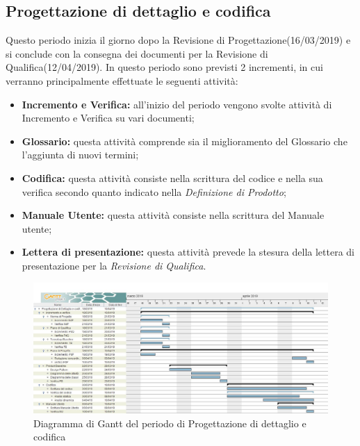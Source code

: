 \subsection{Progettazione di dettaglio e codifica}
Questo periodo inizia il giorno dopo la Revisione di Progettazione(16/03/2019) e si conclude
con la consegna dei documenti per la Revisione di Qualifica(12/04/2019). \newline
In questo periodo sono previsti 2 incrementi, in cui verranno principalmente effettuate le seguenti attività:
\begin{itemize}
	\item{\textbf{Incremento e Verifica:} all’inizio del periodo vengono svolte attività di Incremento e Verifica su vari documenti;}
	\item{\textbf{Glossario:} questa attività comprende sia il miglioramento del Glossario che l’aggiunta di nuovi termini;}
	\item{\textbf{Codifica:} questa attività consiste nella scrittura del codice e nella sua verifica secondo quanto indicato nella \textit{Definizione di Prodotto};}
	\item{\textbf{Manuale Utente:} questa attività consiste nella scrittura del Manuale utente; }
	\item{\textbf{Lettera di presentazione:} questa attività prevede la stesura della lettera di presentazione per la \textit{Revisione di Qualifica}.}
\end{itemize}

\clearpage
\begin{figure}[!htpb]
	\centering
	\includegraphics[width=\textwidth]{Gantt_terza_fase.jpg}
	\caption{Diagramma di Gantt del periodo di Progettazione di dettaglio e codifica}
\end{figure}

